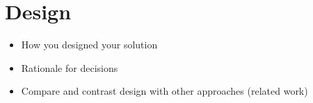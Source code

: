 \chapter{Design}

\begin{itemize}
\item{} How you designed your solution
\item{} Rationale for decisions
\item{} Compare and contrast design with other approaches (related work) 
\end{itemize}